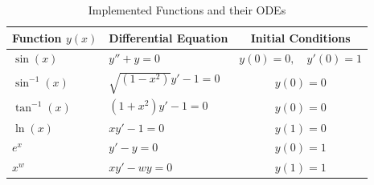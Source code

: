 \documentclass[conference]{IEEEtran}
\begin{document}
\begin{table}[H]
    \centering
    \renewcommand{\arraystretch}{1.5}
    \caption{Implemented Functions and their ODEs}
    \label{tab:diff_eqns_ic}
    \begin{tabular}{@{} l l c @{}}
        \toprule
        \textbf{Function} $y(x)$ & \textbf{Differential Equation} & \textbf{Initial Conditions} \\
        \midrule
        $\sin(x)$ & $y'' + y = 0$ & $y(0)=0, \quad y'(0)=1$ \\
        
        $\sin^{-1}(x)$ & $\sqrt{(1-x^2)}y' - 1 = 0$ & $y(0)=0$ \\
        
        $\tan^{-1}(x)$ & $(1+x^2)y' - 1 = 0$ & $y(0)=0$ \\
        $\ln(x)$ & $ xy' - 1 = 0$ & $y(1)=0$ \\
        $e^x$ & $y' - y = 0$ & $y(0)=1$ \\
        $x^w$ & $xy' - wy = 0$ & $y(1)=1$ \\
        \bottomrule
    \end{tabular}
\end{table}

\end{document}
